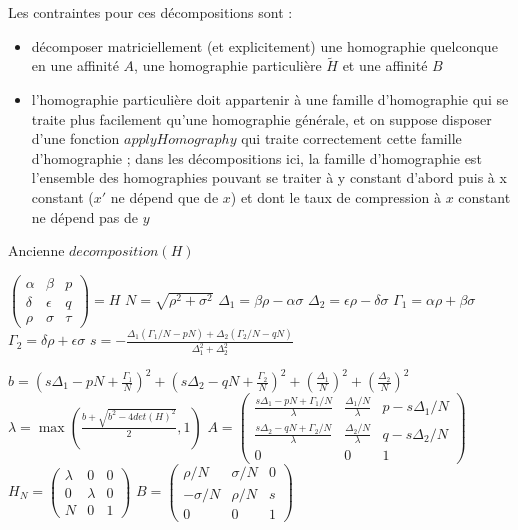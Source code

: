 \documentclass[a4paper,11pt]{article}
\newcommand{\pmatrice}[1]{\begin{pmatrix} #1 \end{pmatrix}}
\newenvironment{algorithme}{\begin{algorithm}[H]}{\end{algorithm}}
\begin{document}
  Les contraintes pour ces décompositions sont :
  \begin{itemize}
  \item décomposer matriciellement (et explicitement) une homographie quelconque en une affinité $A$, une homographie particulière $\tilde H$ et une affinité $B$
  \item l'homographie particulière doit appartenir à une famille d'homographie qui se traite plus facilement qu'une homographie générale, et on suppose disposer d'une fonction $applyHomography$ qui traite correctement cette famille d'homographie ; dans les décompositions ici, la famille d'homographie est l'ensemble des homographies pouvant se traiter à y constant d'abord puis à x constant ($x'$ ne dépend que de $x$) et dont le taux de compression à $x$ constant ne dépend pas de $y$
  \end{itemize}
  
    \begin{algorithme}
     \caption{Ancienne $decomposition(H)$}
     $\pmatrice{
      \alpha&\beta&p\\
      \delta&\epsilon&q\\
      \rho&\sigma&\tau}
      = H$\;
     $N = \sqrt{\rho^2+\sigma^2}$\;
     $\Delta_1 = \beta \rho - \alpha \sigma$\;
     $\Delta_2 = \epsilon \rho - \delta \sigma$\;
     $\Gamma_1 = \alpha \rho + \beta \sigma$\;
     $\Gamma_2 = \delta \rho + \epsilon \sigma$\;
     $s = -\frac
      {\Delta_1(\Gamma_1/N-pN)+\Delta_2(\Gamma_2/N-qN)}
      {\Delta_1^2+\Delta_2^2}$\;
     
     $b = \left(s\Delta_1-pN+\frac{\Gamma_1}{N}\right)^2+\left(s\Delta_2-qN+\frac{\Gamma_2}{N}\right)^2+\left(\frac{\Delta_1}{N}\right)^2+\left(\frac{\Delta_2}{N}\right)^2$\;
     $\lambda = \max\left(\frac{b+\sqrt{b^2-4det(H)^2}}{2},1\right)$\;
     $A = \pmatrice{
      \frac{s\Delta_1-pN+\Gamma_1/N}{\lambda} & \frac{\Delta_1/N}{\lambda} & p - s\Delta_1/N\\
      \frac{s\Delta_2-qN+\Gamma_2/N}{\lambda} & \frac{\Delta_2/N}{\lambda} & q - s\Delta_2/N\\
      0&0&1
      }$\;
     $H_N = \pmatrice{
      \lambda & 0 & 0\\
      0 & \lambda & 0\\
      N & 0 & 1}$\;
     $B = \pmatrice{
      \rho/N&\sigma/N&0\\
      -\sigma/N&\rho/N&s\\
      0&0&1}$\;
    \end{algorithme}
\end{document}
